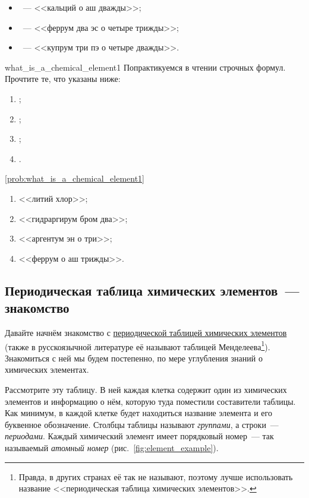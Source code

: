 \begin{itemize}
    \item {}~--- <<кальций о аш дважды>>;
    \item {}~--- <<феррум два эс о четыре трижды>>;
    \item {}~--- <<купрум три пэ о четыре дважды>>.
\end{itemize}

\begin{problem}{}{what_is_a_chemical_element1}
    Попрактикуемся в чтении строчных формул. Прочтите те, что указаны ниже:
    \begin{enumerate}
        \item {};
        \item {};
        \item {};
        \item {}.
    \end{enumerate}

    \begin{sol}{\ref{prob:what_is_a_chemical_element1}}
        \begin{enumerate}
            \item <<литий хлор>>;
            \item <<гидраргирум бром два>>;
            \item <<аргентум эн о три>>;
            \item <<феррум о аш трижды>>.
        \end{enumerate}
    \end{sol}
\end{problem}

\subsection*{Периодическая таблица химических элементов~--- знакомство}

Давайте начнём знакомство с \hyperref[appendix:periodic_table]{периодической таблицей химических элементов} (также в русскоязычной литературе её называют таблицей Менделеева\footnote{Правда, в других странах её так не называют, поэтому лучше использовать название <<периодическая таблица химических элементов>>.}). Знакомиться с ней мы будем постепенно, по мере углубления знаний о химических элементах.

Рассмотрите эту таблицу. В ней каждая клетка содержит один из химических элементов и информацию о нём, которую туда поместили составители таблицы. Как минимум, в каждой клетке будет находиться название элемента и его буквенное обозначение. Столбцы таблицы называют \emph{группами}, а строки~--- \emph{периодами}. Каждый химический элемент имеет порядковый номер~--- так называемый \emph{атомный номер} (рис.~\ref{fig:element_example}).

